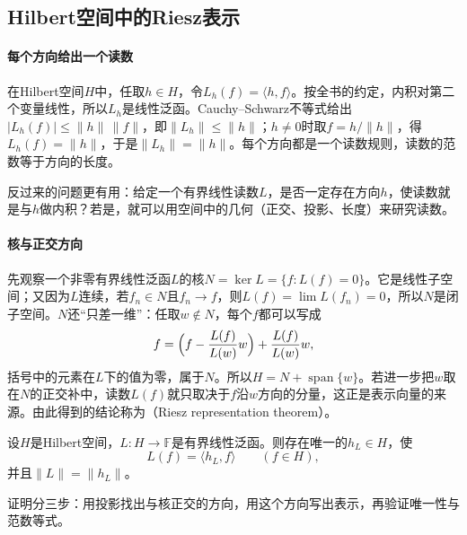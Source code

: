 \subsection{Hilbert空间中的Riesz表示}
\label{sec:lfo-riesz}

\paragraph{每个方向给出一个读数}
在Hilbert空间$H$中，任取$h\in H$，令$L_h(f)=\langle h,f\rangle$。按全书的约定，内积对第二个变量线性，所以$L_h$是线性泛函。Cauchy--Schwarz不等式给出$|L_h(f)|\leq\|h\|\,\|f\|$，即$\|L_h\|\leq\|h\|$；$h\neq0$时取$f=h/\|h\|$，得$L_h(f)=\|h\|$，于是$\|L_h\|=\|h\|$。每个方向都是一个读数规则，读数的范数等于方向的长度。

反过来的问题更有用：给定一个有界线性读数$L$，是否一定存在方向$h$，使读数就是与$h$做内积？若是，就可以用空间中的几何（正交、投影、长度）来研究读数。

\paragraph{核与正交方向}
先观察一个非零有界线性泛函$L$的核$N=\ker L=\{f:L(f)=0\}$。它是线性子空间；又因为$L$连续，若$f_n\in N$且$f_n\to f$，则$L(f)=\lim L(f_n)=0$，所以$N$是闭子空间。$N$还“只差一维”：任取$w\notin N$，每个$f$都可以写成
\[
 f=\Bigl(f-\frac{L(f)}{L(w)}w\Bigr)+\frac{L(f)}{L(w)}w ,
\]
括号中的元素在$L$下的值为零，属于$N$。所以$H=N+\operatorname{span}\{w\}$。若进一步把$w$取在$N$的正交补中，读数$L(f)$就只取决于$f$沿$w$方向的分量，这正是表示向量的来源。由此得到的结论称为（Riesz representation theorem）。

\begin{theorem}[Riesz表示定理]
\label{thm:lfo-riesz}
设$H$是Hilbert空间，$L:H\to\mathbb F$是有界线性泛函。则存在唯一的$h_L\in H$，使
\begin{equation}
 L(f)=\langle h_L,f\rangle\qquad(f\in H),
 \label{eq:lfo-riesz}
\end{equation}
并且$\|L\|=\|h_L\|$。
\end{theorem}

证明分三步：用投影找出与核正交的方向，用这个方向写出表示，再验证唯一性与范数等式。

